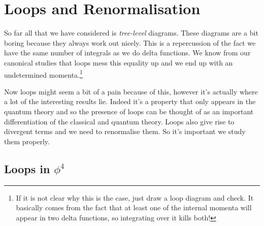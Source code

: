 \chapter{Loops and Renormalisation}

So far all that we have considered is \textit{tree-level} diagrams. These diagrams are a bit boring because they always work out nicely. This is a repercussion of the fact we have the same number of integrals as we do delta functions. We know from our canonical studies that loops mess this equality up and we end up with an undetermined momenta.\footnote{If it is not clear why this is the case, just draw a loop diagram and check. It basically comes from the fact that at least one of the internal momenta will appear in two delta functions, so integrating over it kills both!}

Now loops might seem a bit of a pain because of this, however it's actually where a lot of the interesting results lie. Indeed it's a property that only appears in the quantum theory and so the presence of loops can be thought of as an important differentiation of the classical and quantum theory. Loops also give rise to divergent terms and we need to renormalise them. So it's important we study them properly. 

\section{Loops in $\phi^4$}

